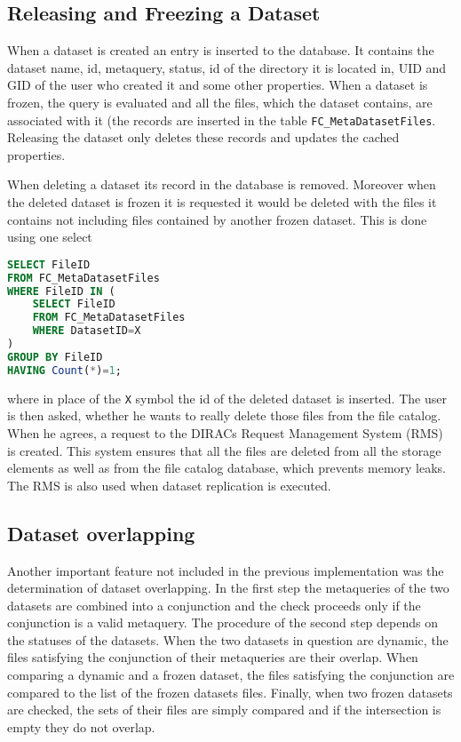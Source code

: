 \subsection{Releasing and Freezing a Dataset}

When a dataset is created an entry is inserted to the database. It contains the dataset name, id, metaquery, 
status, id of the directory it is located in, UID and GID of the user who created it and some other 
properties. When a dataset is frozen, the query is evaluated and all the files, which the
dataset contains, are associated with it (the records are inserted in the table \texttt{FC\_MetaDatasetFiles}.
Releasing the dataset only deletes these records and updates the cached properties. 

When deleting a dataset its record in the database is removed. Moreover when the deleted dataset is frozen
it is requested it would be deleted with the files it contains not including files contained by another frozen
dataset. This is done using one select

\begin{lstlisting}[language=sql]
SELECT FileID 
FROM FC_MetaDatasetFiles 
WHERE FileID IN (
	SELECT FileID 
	FROM FC_MetaDatasetFiles 
	WHERE DatasetID=X
) 
GROUP BY FileID 
HAVING Count(*)=1;
\end{lstlisting}

\noindent where in place of the \texttt{X} symbol the id of the deleted dataset is inserted. The user is then 
asked, whether he wants to really delete those files from the file catalog. When he agrees, a request to
the DIRACs Request Management System (RMS) is created. This system ensures that all the files
are deleted from all the storage elements as well as from the file catalog database, 
which prevents memory leaks. The RMS is also used when dataset replication is executed.

\subsection{Dataset overlapping}

Another important feature not included in the previous implementation was the determination of  
dataset overlapping. In the first step the metaqueries of the two datasets are combined
into a conjunction and the check proceeds only if the conjunction is a valid metaquery.
The procedure of the second step depends on the statuses of the datasets. When the two
datasets in question are dynamic, the files satisfying the conjunction of their metaqueries
are their overlap. When comparing a dynamic and a frozen dataset, the files satisfying 
the conjunction are compared to the list of the frozen datasets files. Finally, when 
two frozen datasets are checked, the sets of their files are simply compared and if 
the intersection is empty they do not overlap.